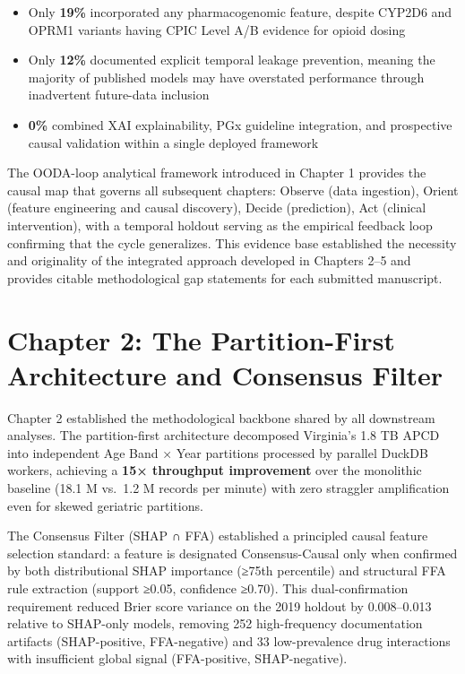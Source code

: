 \documentclass[
  12pt,
]{book}
\providecommand{\tightlist}{%
  \setlength{\itemsep}{0pt}\setlength{\parskip}{0pt}}
\begin{document}
\begin{itemize}
\tightlist
\item
  Only \textbf{19\%} incorporated any pharmacogenomic feature, despite
  CYP2D6 and OPRM1 variants having CPIC Level A/B evidence for opioid
  dosing
\item
  Only \textbf{12\%} documented explicit temporal leakage prevention,
  meaning the majority of published models may have overstated
  performance through inadvertent future-data inclusion
\item
  \textbf{0\%} combined XAI explainability, PGx guideline integration,
  and prospective causal validation within a single deployed framework
\end{itemize}

The OODA-loop analytical framework introduced in Chapter 1 provides the
causal map that governs all subsequent chapters: Observe (data
ingestion), Orient (feature engineering and causal discovery), Decide
(prediction), Act (clinical intervention), with a temporal holdout
serving as the empirical feedback loop confirming that the cycle
generalizes. This evidence base established the necessity and
originality of the integrated approach developed in Chapters 2--5 and
provides citable methodological gap statements for each submitted
manuscript.

\section{Chapter 2: The Partition-First Architecture and Consensus
Filter}\label{chapter-2-the-partition-first-architecture-and-consensus-filter}

Chapter 2 established the methodological backbone shared by all
downstream analyses. The partition-first architecture decomposed
Virginia's 1.8 TB APCD into independent Age Band × Year partitions
processed by parallel DuckDB workers, achieving a \textbf{15× throughput
improvement} over the monolithic baseline (18.1 M vs.~1.2 M records per
minute) with zero straggler amplification even for skewed geriatric
partitions.

The Consensus Filter (SHAP ∩ FFA) established a principled causal
feature selection standard: a feature is designated Consensus-Causal
only when confirmed by both distributional SHAP importance (≥75th
percentile) and structural FFA rule extraction (support ≥0.05,
confidence ≥0.70). This dual-confirmation requirement reduced Brier
score variance on the 2019 holdout by 0.008--0.013 relative to SHAP-only
models, removing 252 high-frequency documentation artifacts
(SHAP-positive, FFA-negative) and 33 low-prevalence drug interactions
with insufficient global signal (FFA-positive, SHAP-negative).
\end{document}
